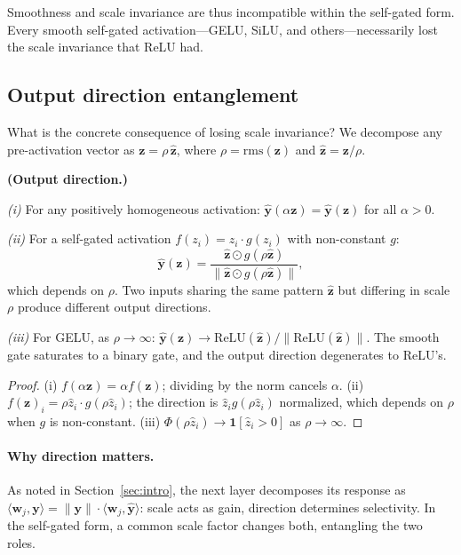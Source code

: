 Smoothness and scale invariance are thus incompatible within the self-gated form.
Every smooth self-gated activation---GELU, SiLU, and others---necessarily lost the scale invariance that ReLU had.

\subsection{Output direction entanglement}\label{sec:direction}

What is the concrete consequence of losing scale invariance?
We decompose any pre-activation vector as $\mathbf{z} = \rho\,\hat{\mathbf{z}}$, where $\rho = \mathrm{rms}(\mathbf{z})$ and $\hat{\mathbf{z}} = \mathbf{z}/\rho$.

\begin{proposition}\label{prop:direction}
\textbf{(Output direction.)}

\emph{(i)} For any positively homogeneous activation: $\hat{\mathbf{y}}(\alpha\mathbf{z}) = \hat{\mathbf{y}}(\mathbf{z})$ for all $\alpha > 0$.

\emph{(ii)} For a self-gated activation $f(z_i) = z_i \cdot g(z_i)$ with non-constant $g$:
\begin{equation}
    \hat{\mathbf{y}}(\mathbf{z}) = \frac{\hat{\mathbf{z}} \odot g(\rho\hat{\mathbf{z}})}{\|\hat{\mathbf{z}} \odot g(\rho\hat{\mathbf{z}})\|},
\end{equation}
which depends on $\rho$.
Two inputs sharing the same pattern $\hat{\mathbf{z}}$ but differing in scale $\rho$ produce different output directions.

\emph{(iii)} For GELU, as $\rho \to \infty$:
$\hat{\mathbf{y}}(\mathbf{z}) \to \mathrm{ReLU}(\hat{\mathbf{z}})/\|\mathrm{ReLU}(\hat{\mathbf{z}})\|$.
The smooth gate saturates to a binary gate, and the output direction degenerates to ReLU's.
\end{proposition}

\begin{proof}
(i) $f(\alpha\mathbf{z}) = \alpha f(\mathbf{z})$; dividing by the norm cancels $\alpha$.
(ii) $f(\mathbf{z})_i = \rho\hat{z}_i \cdot g(\rho\hat{z}_i)$; the direction is $\hat{z}_i g(\rho\hat{z}_i)$ normalized, which depends on $\rho$ when $g$ is non-constant.
(iii) $\Phi(\rho\hat{z}_i) \to \mathbf{1}[\hat{z}_i > 0]$ as $\rho \to \infty$.
\end{proof}

\paragraph{Why direction matters.}
As noted in Section~\ref{sec:intro}, the next layer decomposes its response as $\langle \mathbf{w}_j, \mathbf{y} \rangle = \|\mathbf{y}\| \cdot \langle \mathbf{w}_j, \hat{\mathbf{y}} \rangle$: scale acts as gain, direction determines selectivity.
In the self-gated form, a common scale factor changes both, entangling the two roles.

